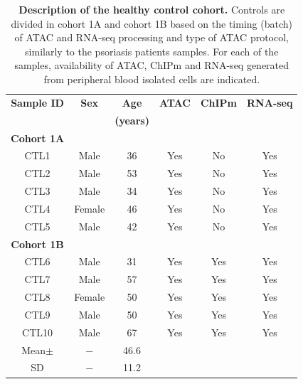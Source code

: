 \begin{table}[ht]
\centering
\begin{tabular}{@{} c c c c c c}
\toprule
\textbf{Sample ID} & \textbf{Sex} & \textbf{Age}    & \textbf{ATAC} & \textbf{ChIPm} & \textbf{RNA-seq}\\
                   &             & \textbf{(years)} &               &                &                  \\
\midrule
\midrule
\textbf{Cohort 1A} & & & & & \\
\midrule
CTL1 & Male   & 36 & Yes& No& Yes\\
CTL2 & Male   & 53 & Yes& No& Yes\\
CTL3 & Male   & 34 & Yes& No& Yes\\
CTL4 & Female & 46 & Yes& No& Yes\\
CTL5 & Male   & 42 & Yes& No& Yes\\
\midrule
\midrule
\textbf{Cohort 1B} & & & & & \\
\midrule
CTL6  & Male   & 31 & Yes& Yes& Yes\\
CTL7  & Male   & 57 & Yes& Yes& Yes\\
CTL8  & Female & 50 & Yes& Yes& Yes\\
CTL9  & Male   & 50 & Yes& Yes& Yes\\
CTL10 & Male   & 67 & Yes& Yes& Yes\\
\midrule
Mean$\pm$ & $-$ & 46.6 & & & \\ 
SD        & $-$ & 11.2 & & & \\
\bottomrule
\end{tabular}
\medskip %
\caption[Description of the healthy control cohort.]{\textbf{Description of the healthy control cohort.} Controls are divided in cohort 1A and cohort 1B based on the timing (batch) of ATAC and RNA-seq processing and type of ATAC protocol, similarly to the psoriasis patients samples. For each of the samples, availability of ATAC, ChIPm and RNA-seq generated from peripheral blood isolated cells are indicated.}
\label{tab:Control_cohort_metadata}
\end{table}
\bigskip %


